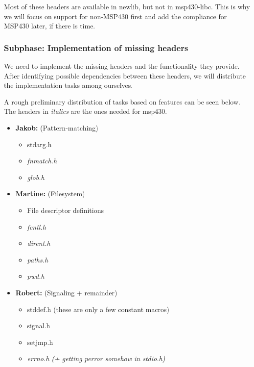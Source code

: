 \documentclass[11pt,
  a4paper,
  BCOR=7mm
]{scrartcl}
\begin{document}
Most of these headers are available in newlib, but not in msp430-libc.
This is why we will focus on support for non-MSP430 first and add the compliance
for MSP430 later, if there is time.

\subsubsection*{Subphase: Implementation of missing headers}
\label{ssub:headers_implementation}
We need to implement the missing headers and the functionality they
provide. After identifying possible dependencies between these headers,
we will distribute the implementation tasks among ourselves.


A rough preliminary distribution of tasks based on features can be seen below. 
The headers in \emph{italics} are the ones needed for msp430.

\begin{itemize}
    \item   \textbf{Jakob:} (Pattern-matching)
            \begin{itemize}
                \item   stdarg.h
                \item   \emph{fnmatch.h}
                \item   \emph{glob.h}
            \end{itemize}
    \item   \textbf{Martine:} (Filesystem)
            \begin{itemize}
                \item   File descriptor definitions
                \item   \emph{fcntl.h}
                \item   \emph{dirent.h}
                \item   \emph{paths.h}
                \item   \emph{pwd.h}
            \end{itemize}
    \item   \textbf{Robert:} (Signaling + remainder)
            \begin{itemize}
                \item   stddef.h (these are only a few constant macros)
                \item   signal.h
                \item   setjmp.h
                \item   \emph{errno.h (+ getting perror somehow in stdio.h)}
            \end{itemize}
\end{itemize}
\end{document}
